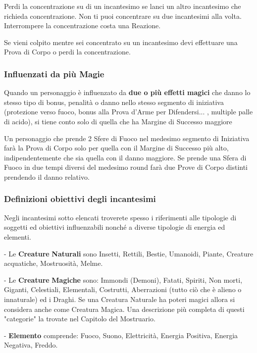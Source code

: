 \documentclass[12pt,a4paper,twoside,openany]{book}
\begin{document}
\begin{multicols}{2}
Perdi la concentrazione su di un incantesimo se lanci un altro incantesimo che richieda concentrazione. Non ti puoi concentrare su due incantesimi alla volta. Interrompere la concentrazione costa una Reazione.

Se vieni colpito mentre sei concentrato su un incantesimo devi effettuare una Prova di Corpo o perdi la concentrazione.

\subsubsection{Influenzati da più Magie}\label{magieinfluenzatodapiumagie}

Quando un personaggio è influenzato da \textbf{due o più effetti magici} che danno lo stesso tipo di bonus, penalità o danno nello stesso segmento di iniziativa (protezione verso fuoco, bonus alla Prova d'Arme per Difendersi... , multiple palle di acido), si tiene conto solo di quella che ha Margine di Successo maggiore

Un personaggio che prende 2 Sfere di Fuoco nel medesimo segmento di Iniziativa farà la Prova di Corpo solo per quella con il Margine di Successo più alto, indipendentemente che sia quella con il danno maggiore. Se prende una Sfera di Fuoco in due tempi diversi del medesimo round farà due Prove di Corpo distinti prendendo il danno relativo.

\subsubsection{Definizioni obiettivi degli incantesimi}\label{magiedefinizioniobiettivi}

Negli incantesimi sotto elencati troverete spesso i riferimenti alle tipologie di soggetti ed obiettivi influenzabili nonché a diverse tipologie di energia ed elementi.

- Le \textbf{Creature} \textbf{Naturali} sono Insetti, Rettili, Bestie, Umanoidi, Piante, Creature acquatiche, Mostruosità, Melme.

- Le \textbf{Creature} \textbf{Magiche} sono: Immondi (Demoni), Fatati, Spiriti, Non morti, Giganti, Celestiali, Elementali, Costrutti, Aberrazioni (tutto ciò che è alieno o innaturale) ed i  Draghi.
Se una Creatura Naturale ha poteri magici allora si considera anche come Creatura Magica. Una descrizione più completa di questi "categorie" la trovate nel Capitolo del Mostruario.

- \textbf{Elemento} comprende: Fuoco, Suono, Elettricità, Energia Positiva, Energia Negativa, Freddo.

\end{multicols}
\end{document}
